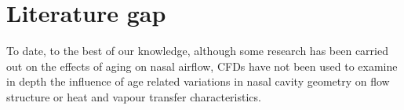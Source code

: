 \section{Literature gap}

To date, to the best of our knowledge, although some research has been carried out on the effects of aging on nasal airflow, CFDs have not been used to examine in depth the influence of age related variations in nasal cavity geometry on flow structure or heat and vapour transfer characteristics. 

%
%

